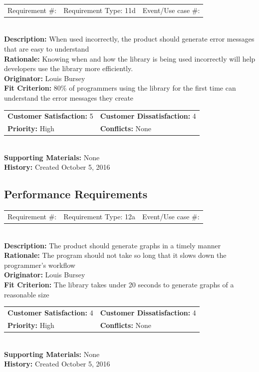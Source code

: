 \documentclass[12pt, titlepage]{article}
\begin{document}
%
%
\begin{reqbox}
\begin{tabular}{ccc}
Requirement \#: & Requirement Type: 11d & Event/Use case \#: \\
\end{tabular} \\
\textbf{Description:} When used incorrectly, the product should generate error messages that are easy to understand \\
\textbf{Rationale:} Knowing when and how the library is being used incorrectly will help developers use the library more efficiently. \\
\textbf{Originator:} Louis Bursey\\
\textbf{Fit Criterion:}  80\% of programmers using the library for the first time can understand the error messages they create \\
\begin{tabular}{ll}
\textbf{Customer Satisfaction:} 5 & \textbf{Customer Dissatisfaction:} 4 \\
\textbf{Priority:} High & \textbf{Conflicts:} None\\
\end{tabular} \\
\textbf{Supporting Materials:} None \\
\textbf{History:} Created October 5, 2016
\end{reqbox}
%
%

\subsection{Performance Requirements}
%
%
\begin{reqbox}
\begin{tabular}{ccc}
Requirement \#: & Requirement Type: 12a & Event/Use case \#: \\
\end{tabular} \\
\textbf{Description:} The product should generate graphs in a timely manner \\
\textbf{Rationale:} The program should not take so long that it slows down the programmer's workflow \\
\textbf{Originator:} Louis Bursey\\
\textbf{Fit Criterion:}  The library takes under 20 seconds to generate graphs of a reasonable size \\
\begin{tabular}{ll}
\textbf{Customer Satisfaction:} 4 & \textbf{Customer Dissatisfaction:} 4 \\
\textbf{Priority:} High & \textbf{Conflicts:} None\\
\end{tabular} \\
\textbf{Supporting Materials:} None \\
\textbf{History:} Created October 5, 2016
\end{reqbox}
%
%
\end{document}
